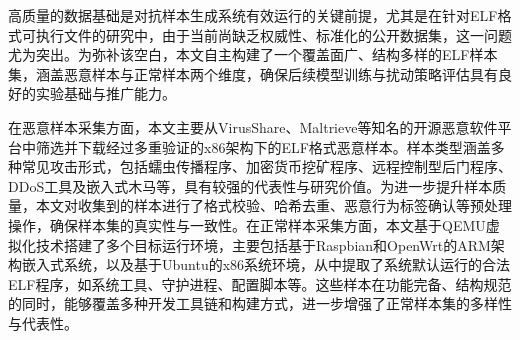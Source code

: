 
高质量的数据基础是对抗样本生成系统有效运行的关键前提，尤其是在针对ELF格式可执行文件的研究中，由于当前尚缺乏权威性、标准化的公开数据集，这一问题尤为突出。为弥补该空白，本文自主构建了一个覆盖面广、结构多样的ELF样本集，涵盖恶意样本与正常样本两个维度，确保后续模型训练与扰动策略评估具有良好的实验基础与推广能力。


在恶意样本采集方面，本文主要从VirusShare\cite{VirusShare}、Maltrieve等知名的开源恶意软件平台中筛选并下载经过多重验证的x86架构下的ELF格式恶意样本。样本类型涵盖多种常见攻击形式，包括蠕虫传播程序、加密货币挖矿程序、远程控制型后门程序、DDoS工具及嵌入式木马等，具有较强的代表性与研究价值。为进一步提升样本质量，本文对收集到的样本进行了格式校验、哈希去重、恶意行为标签确认等预处理操作，确保样本集的真实性与一致性。在正常样本采集方面，本文基于QEMU虚拟化技术搭建了多个目标运行环境，主要包括基于Raspbian和OpenWrt的ARM架构嵌入式系统，以及基于Ubuntu的x86系统环境，从中提取了系统默认运行的合法ELF程序，如系统工具、守护进程、配置脚本等。这些样本在功能完备、结构规范的同时，能够覆盖多种开发工具链和构建方式，进一步增强了正常样本集的多样性与代表性。


